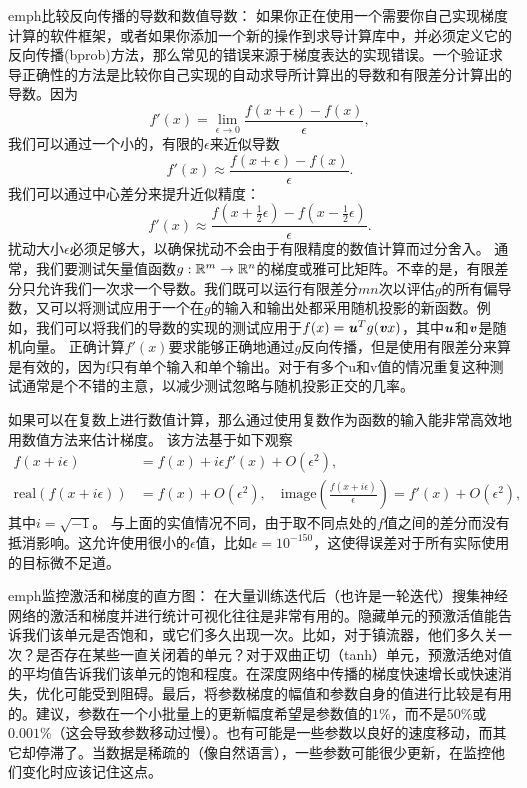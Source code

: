 emph{比较反向传播的导数和数值导数}：
如果你正在使用一个需要你自己实现梯度计算的软件框架，或者如果你添加一个新的操作到求导计算库中，并必须定义它的反向传播(bprob)方法，那么常见的错误来源于梯度表达的实现错误。一个验证求导正确性的方法是比较你自己实现的自动求导所计算出的导数和有限差分计算出的导数。因为
\begin{equation}
    f'(x) = \lim_{\epsilon \to 0} \frac{f(x+\epsilon) - f(x)}{\epsilon},
\end{equation}
我们可以通过一个小的，有限的$\epsilon$来近似导数
\begin{equation}
    f'(x) \approx \frac{f(x+\epsilon) - f(x)}{\epsilon}.
\end{equation}
我们可以通过中心差分来提升近似精度：
\begin{equation}
    f'(x) \approx \frac{ f(x+\frac{1}{2}\epsilon) - f(x-\frac{1}{2}\epsilon) }{\epsilon}.
\end{equation}
扰动大小$\epsilon$必须足够大，以确保扰动不会由于有限精度的数值计算而过分舍入。
通常，我们要测试矢量值函数$g:\mathbb{R}^m \to \mathbb{R}^n$的梯度或雅可比矩阵。不幸的是，有限差分只允许我们一次求一个导数。我们既可以运行有限差分$mn$次以评估$g$的所有偏导数，又可以将测试应用于一个在$g$的输入和输出处都采用随机投影的新函数。例如，我们可以将我们的导数的实现的测试应用于$f(x) = \boldsymbol{\mathit{u}}^T g(\boldsymbol{\mathit{v}} x)$，其中$\boldsymbol{\mathit{u}}$和$\boldsymbol{\mathit{v}}$是随机向量。
正确计算$f'(x)$要求能够正确地通过$g$反向传播，但是使用有限差分来算是有效的，因为f只有单个输入和单个输出。对于有多个u和v值的情况重复这种测试通常是个不错的主意，以减少测试忽略与随机投影正交的几率。

如果可以在复数上进行数值计算，那么通过使用复数作为函数的输入能非常高效地用数值方法来估计梯度\citep{Squire+Trapp-1998}。
该方法基于如下观察
\begin{align}
    f(x + i\epsilon) &= f(x) + i\epsilon f'(x) + O(\epsilon^2) ,\\
    \text{real}( f(x+i\epsilon) ) &= f(x) + O(\epsilon^2), \quad \text{image}( \frac{f(x+i\epsilon)}{ \epsilon } ) = f'(x) + O(\epsilon^2),
\end{align}
其中$i=\sqrt{-1}$。
与上面的实值情况不同，由于取不同点处的$f$值之间的差分而没有抵消影响。这允许使用很小的$\epsilon$值，比如$\epsilon = 10^{-150}$，这使得误差对于所有实际使用的目标微不足道。

emph{监控激活和梯度的直方图}：
在大量训练迭代后（也许是一轮迭代）搜集神经网络的激活和梯度并进行统计可视化往往是非常有用的。隐藏单元的预激活值能告诉我们该单元是否饱和，或它们多久出现一次。比如，对于镇流器，他们多久关一次？是否存在某些一直关闭着的单元？对于双曲正切（tanh）单元，预激活绝对值的平均值告诉我们该单元的饱和程度。在深度网络中传播的梯度快速增长或快速消失，优化可能受到阻碍。最后，将参数梯度的幅值和参数自身的值进行比较是有用的。\citep{Bottou-DLSS2015}建议，参数在一个小批量上的更新幅度希望是参数值的$1\%$，而不是$50\%$或$0.001\%$（这会导致参数移动过慢）。也有可能是一些参数以良好的速度移动，而其它却停滞了。当数据是稀疏的（像自然语言），一些参数可能很少更新，在监控他们变化时应该记住这点。

